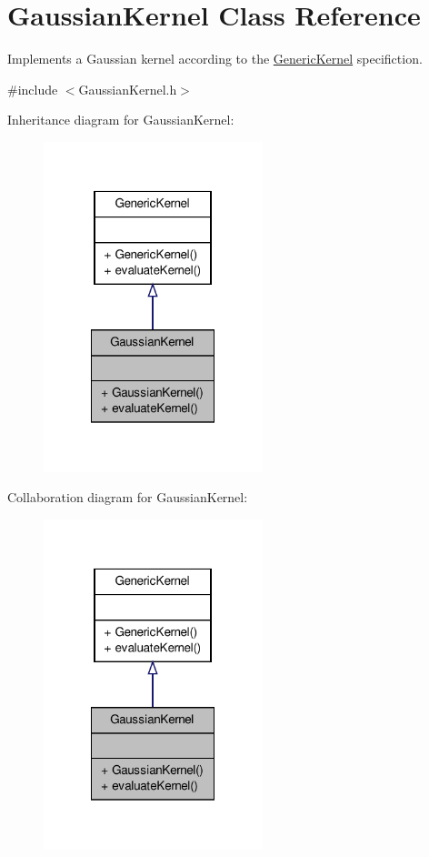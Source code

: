 \hypertarget{classGaussianKernel}{\section{\-Gaussian\-Kernel \-Class \-Reference}
\label{classGaussianKernel}
}


\-Implements a \-Gaussian kernel according to the \hyperlink{classGenericKernel}{\-Generic\-Kernel} specifiction.  




{\ttfamily \#include $<$\-Gaussian\-Kernel.\-h$>$}



\-Inheritance diagram for \-Gaussian\-Kernel\-:\nopagebreak
\begin{figure}[H]
\begin{center}
\leavevmode
\includegraphics[width=180pt]{classGaussianKernel__inherit__graph}
\end{center}
\end{figure}


\-Collaboration diagram for \-Gaussian\-Kernel\-:\nopagebreak
\begin{figure}[H]
\begin{center}
\leavevmode
\includegraphics[width=180pt]{classGaussianKernel__coll__graph}
\end{center}
\end{figure}
